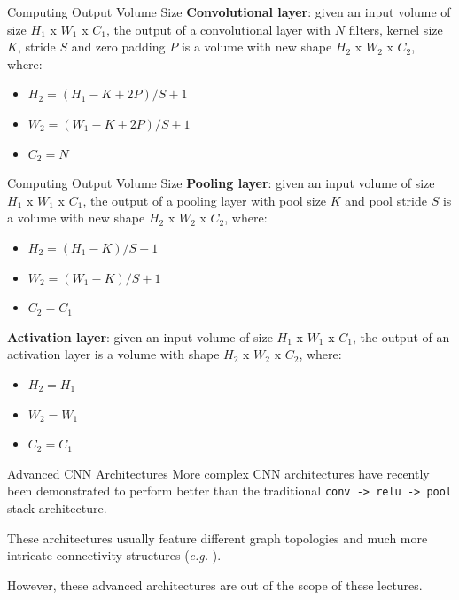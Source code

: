 \documentclass[aspectratio=169]{beamer}
\begin{document}

\begin{frame}{Computing Output Volume Size}
\textbf{Convolutional layer}: given an input volume of size $H_1$ x $W_1$ x $C_1$, the output of a convolutional layer with $N$ filters, kernel size $K$, stride $S$ and zero padding $P$ is a volume with new shape $H_2$ x $W_2$ x $C_2$, where:
\begin{itemize}
\item $H_2 = (H_1 - K + 2P) / S + 1$ 
\item $W_2 = (W_1 - K + 2P) / S + 1$ 
\item $C_2 = N$
\end{itemize}
\end{frame}


\begin{frame}{Computing Output Volume Size}
\textbf{Pooling layer}: given an input volume of size $H_1$ x $W_1$ x $C_1$, the output of a pooling layer with pool size $K$ and pool stride $S$ is a volume with new shape $H_2$ x $W_2$ x $C_2$, where:
\begin{itemize}
\item $H_2 = (H_1 - K) / S + 1$ 
\item $W_2 = (W_1 - K) / S + 1$ 
\item $C_2 = C_1$
\end{itemize}
\textbf{Activation layer}: given an input volume of size $H_1$ x $W_1$ x $C_1$, the output of an activation layer is a volume with shape $H_2$ x $W_2$ x $C_2$, where:
\begin{itemize}
\item $H_2 = H_1$ 
\item $W_2 = W_1$ 
\item $C_2 = C_1$
\end{itemize}
\end{frame}


\begin{frame}{Advanced CNN Architectures}
More complex CNN architectures have recently been demonstrated to perform better than the traditional \texttt{conv -> relu -> pool } stack architecture.

These architectures usually feature different graph topologies and much more intricate connectivity structures (\emph{e.g.} \cite{he2016deep,szegedy2016rethinking}).

However, these advanced architectures are out of the scope of these lectures.
\end{frame}
\end{document}
